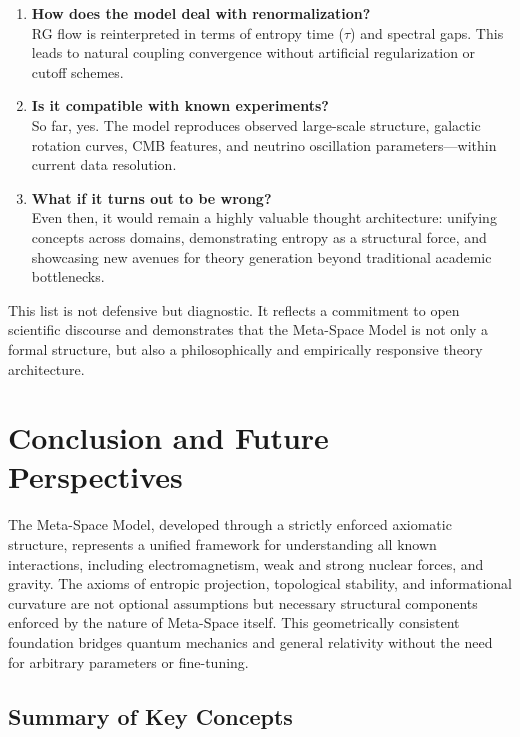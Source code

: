 \documentclass[10.5pt,a4paper]{article}
\begin{document}
\begin{enumerate}
    \item \textbf{How does the model deal with renormalization?}\\
    RG flow is reinterpreted in terms of entropy time (\( \tau \)) and spectral gaps. This leads to natural coupling convergence without artificial regularization or cutoff schemes.
    
    \item \textbf{Is it compatible with known experiments?}\\
    So far, yes. The model reproduces observed large-scale structure, galactic rotation curves, CMB features, and neutrino oscillation parameters—within current data resolution.
    
    \item \textbf{What if it turns out to be wrong?}\\
    Even then, it would remain a highly valuable thought architecture: unifying concepts across domains, demonstrating entropy as a structural force, and showcasing new avenues for theory generation beyond traditional academic bottlenecks.
\end{enumerate}

This list is not defensive but diagnostic. It reflects a commitment to open scientific discourse and demonstrates that the Meta-Space Model is not only a formal structure, but also a philosophically and empirically responsive theory architecture.

\clearpage

\section{Conclusion and Future Perspectives}

The Meta-Space Model, developed through a strictly enforced axiomatic structure, represents a unified framework for understanding all known interactions, including electromagnetism, weak and strong nuclear forces, and gravity. The axioms of entropic projection, topological stability, and informational curvature are not optional assumptions but necessary structural components enforced by the nature of Meta-Space itself. This geometrically consistent foundation bridges quantum mechanics and general relativity without the need for arbitrary parameters or fine-tuning.

\subsection{Summary of Key Concepts}
\end{document}
